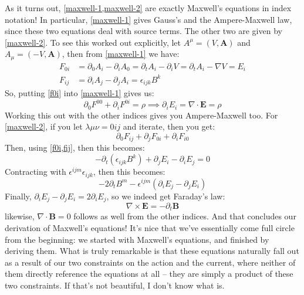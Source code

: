 As it turns out, \cref{maxwell-1,maxwell-2} are exactly Maxwell's equations in index notation! In particular,
\cref{maxwell-1} gives Gauss's and the Ampere-Maxwell law, since these two equations deal with source terms.
The other two are given by \cref{maxwell-2}. To see this worked out 
explicitly, let \( A^{\mu} = (V, \mathbf{A}) \) and \( A_\mu = (-V, \mathbf{A}) \), then from
\cref{maxwell-1} we have:
\begin{align}
	\label{f0i}F_{0i} &= \partial_0 A_i - \partial_i A_0 = \partial_t A_i - \partial_i V = \partial_t A_i - \nabla V =
	E_i\\
	\label{fij}F_{ij} &= \partial_i A_j - \partial_j A_i = \epsilon_{ijk}B^{k}
\end{align}
So, putting \cref{f0i} into \cref{maxwell-1} gives us:
\[
	\partial_0 F^{00} + \partial_i F^{0i} = \rho \implies \partial_i E_i = \nabla \cdot \mathbf{E} = \rho
\]
Working this out with the other indices gives you Ampere-Maxwell too. For \cref{maxwell-2}, if you let \(
\lambda \mu \nu = 0ij \) and iterate, then you get:
\[
	\partial_0 F_{ij} + \partial_j F_{0i} + \partial_{i}F_{i0}
\]
Then, using \cref{f0i,fij}, then this becomes:
\[
	-\partial_t \left( \epsilon_{ijk}B^{k} \right) + \partial_j E_i - \partial_i E_j = 0
\]
Contracting with \( \epsilon^{ijm} \epsilon_{ijk} \), then this becomes:
\[
	-2 \partial_t B^{m} - \epsilon^{ijm}\left( \partial_i E_j - \partial_j E_i \right)	
\]
Finally, \( \partial_i E_j - \partial_j E_i = 2 \partial_i E_j \), so we indeed get Faraday's law:
\[
	\nabla \times \mathbf{E} = -\partial_t \mathbf{B}
\]
likewise, \( \nabla \cdot \mathbf{B} = 0 \) follows as well from the other indices. And that concludes our
derivation of Maxwell's equations! It's nice that we've essentially come full circle from the beginning: we
started with Maxwell's equations, and finished by deriving them. What is truly remarkable is that these
equations naturally fall out as a result of our two constraints on the action and the current, where neither
of them directly reference the equations at all -- they are simply a product of these two constraints. If
that's not beautiful, I don't know what is. 
 
 
